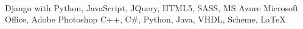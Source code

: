 \\
\begin{cvskills}
	 {Django with Python, JavaScript, JQuery, HTML5, SASS, MS Azure}
	 {Microsoft Office, Adobe Photoshop}
	 {C++, C\#, Python, Java, VHDL, Scheme, LaTeX}
  \end{cvskills}

